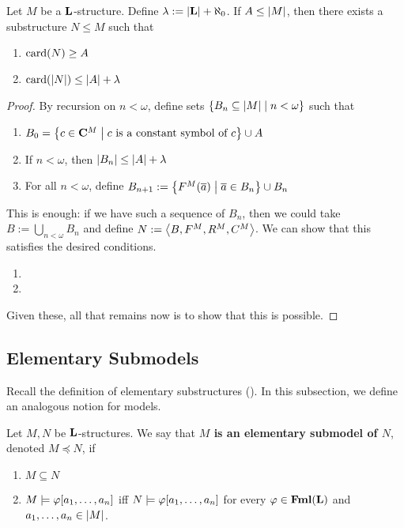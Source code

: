 \begin{boxtheorem}
    Let $M$ be a $\mathbf{L}$-structure. Define $\lambda := \left\lvert \mathbf{L} \right\rvert + \aleph_{0}$. If $A \leq \left\lvert M \right\rvert$, then there exists a substructure $N \leq M$ such that
    \begin{enumerate}[label = (\alph*)]
        \item $\operatorname{card}\!\left( N \right) \geq A$
        \item $\operatorname{card}\!\left( \left\lvert N \right\rvert \right) \leq \left\lvert A \right\rvert + \lambda$
    \end{enumerate}
\end{boxtheorem}
\begin{proof}
    By recursion on $n < \omega$, define sets $\left\{ B_{n} \subseteq \left\lvert M \right\rvert \; \middle\vert \; n < \omega \right\}$ such that
    \begin{enumerate}
        \item $B_{0} = \left\{ c \in \mathbf{C}^M \; \middle\vert \; c \text{ is a constant symbol of } c \right\} \cup A$
        \item If $n < \omega$, then $\left\lvert B_n \right\rvert \leq \left\lvert A \right\rvert + \lambda$
        \item For all $n < \omega$, define $B_{n+1} := \left\{ F^M\!\left( \overline{a} \right) \; \middle\vert \; \overline{a} \in B_{n} \right\} \cup B_n$
    \end{enumerate}
    This is enough: if we have such a sequence of $B_n$, then we could take $B := \bigcup_{n < \omega} B_n$ and define $N := \left\langle B, F^M, R^M, C^M \right\rangle$. We can show that this satisfies the desired conditions.
    \begin{enumerate}[label = (\alph*)]
        \item \sorry
        \item \sorry
    \end{enumerate}

    Given these, all that remains now is to show that this is possible. \sorry{}
\end{proof}

\subsection{Elementary Submodels}

Recall the definition of elementary substructures (\sorry). In this subsection, we define an analogous notion for models.

\begin{boxdefinition}
    Let $M, N$ be $\mathbf{L}$-structures. We say that \textbf{$M$ is an elementary submodel of $N$}, denoted $M \preceq N$, if
    \begin{enumerate}
        \item $M \subseteq N$
        \item $M \models \varphi\!\left[ a_1, \ldots, a_n \right]$ iff $N \models \varphi\!\left[ a_1, \ldots, a_n \right]$ for every $\varphi \in \mathbf{Fml}\!\left( \mathbf{L} \right)$ and $a_1, \ldots, a_n \in \left\lvert M \right\rvert$.
    \end{enumerate}
\end{boxdefinition}

